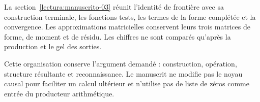 La section~\ref{lectura:manuscrito-03} réunit l'identité de frontière avec sa construction terminale, les fonctions tests, les termes de la forme complétée et la convergence. Les approximations matricielles conservent leurs trois matrices de forme, de moment et de résidu. Les chiffres ne sont comparés qu'après la production et le gel des sorties.

Cette organisation conserve l'argument demandé : construction, opération, structure résultante et reconnaissance. Le manuscrit ne modifie pas le noyau causal pour faciliter un calcul ultérieur et n'utilise pas de liste de zéros comme entrée du producteur arithmétique.
